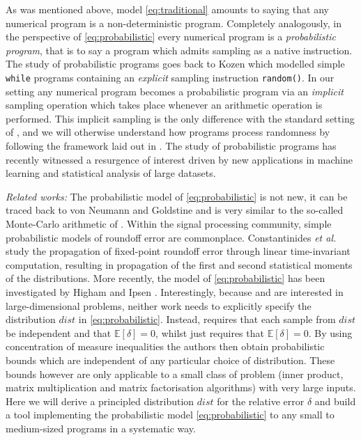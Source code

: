 \documentclass[10pt,conference]{IEEEtran}
\newcommand{\Exp}[1]{\mathbb{E}\left[#1\right]}
\newcommand{\Rocco}{\textcolor{blue}}
\begin{document}
As was mentioned above, model \eqref{eq:traditional} amounts to saying that any numerical program is a non-deterministic program. Completely analogously, in the perspective of \cref{eq:probabilistic} every numerical program is a \emph{probabilistic program}, that is to say a program which admits sampling as a native instruction. The study of probabilistic programs goes back to Kozen \cite{K81c} which modelled simple \texttt{while} programs containing an \emph{explicit} sampling instruction \texttt{random()}. In our setting any numerical program becomes a probabilistic program via an \emph{implicit} sampling operation which takes place whenever an arithmetic operation is performed. This implicit sampling is the only difference with the standard setting of \cite{K81c}, and we will otherwise understand how programs process randomness by following the framework laid out in \cite{K81c}. The study of probabilistic programs has recently witnessed a resurgence of interest driven by new applications in machine learning and statistical analysis of large datasets.

%
\emph{Related works: }
The probabilistic model of \cref{eq:probabilistic} is not new, it can be traced back to von Neumann and Goldstine \cite{von1947numerical} and is very similar to the so-called Monte-Carlo arithmetic of \cite{parker1997monte}. Within the signal processing 
community, simple probabilistic models of roundoff error are commonplace. Constantinides {\em et al.}~\cite{constantinides2004synthesis} study the propagation of fixed-point roundoff error through linear time-invariant computation, resulting in propagation of the
first and second statistical moments of the distributions.
 More recently, the model of \cref{eq:probabilistic} has been investigated by Higham \cite{higham2019new}
and Ipsen \cite{ipsen2019probabilistic}. Interestingly, because \cite{higham2019new} and \cite{ipsen2019probabilistic} are interested in large-dimensional problems, neither work needs to explicitly specify the distribution $dist$ in \cref{eq:probabilistic}. Instead, \cite{higham2019new} requires that each sample from $dist$ be independent and that $\Exp{\delta}=0$, whilst \cite{ipsen2019probabilistic} just requires that $\Exp{\delta}=0$. By using concentration of measure inequalities the authors then obtain probabilistic bounds which are independent of any particular choice of distribution. 
These bounds however are only applicable to a small class of problem (inner product, matrix multiplication and matrix factorisation algorithms) with very large inputs. Here we will derive a principled distribution $dist$ for the relative error $\delta$ and build a tool implementing the probabilistic model \cref{eq:probabilistic} to any small to medium-sized programs in a systematic way.
\end{document}

